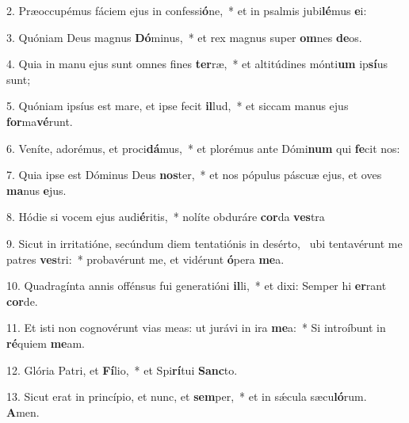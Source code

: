 2. Præoccupémus fáciem ejus in confessi\textbf{ó}ne,~*  et in psalmis jubi\textbf{lé}mus \textbf{e}i:\

3. Quóniam Deus magnus \textbf{Dó}minus,~*  et rex magnus super \textbf{om}nes \textbf{de}os.\

4. Quia in manu ejus sunt omnes fines \textbf{ter}ræ,~*  et altitúdines mónti\textbf{um} ip\textbf{sí}us sunt;\

5. Quóniam ipsíus est mare, et ipse fecit \textbf{il}lud,~*  et siccam manus ejus \textbf{for}ma\textbf{vé}runt.\

6. Veníte, adorémus, et proci\textbf{dá}mus,~*  et plorémus ante Dómi\textbf{num} qui \textbf{fe}cit nos:\

7. Quia ipse est Dóminus Deus \textbf{nos}ter,~*  et nos pópulus páscuæ ejus, et oves \textbf{ma}nus \textbf{e}jus.\

8. Hódie si vocem ejus audi\textbf{é}ritis,~*  nolíte obduráre \textbf{cor}da \textbf{ves}tra\

9. Sicut in irritatióne, secúndum diem tentatiónis in desérto, \dag\  ubi tentavérunt me patres \textbf{ves}tri:~*  probavérunt me, et vidérunt \textbf{ó}pera \textbf{me}a.\

10. Quadragínta annis offénsus fui generatióni \textbf{il}li,~*  et dixi: Semper hi \textbf{er}rant \textbf{cor}de.\

11. Et isti non cognovérunt vias meas: ut jurávi in ira \textbf{me}a:~*  Si introíbunt in \textbf{ré}quiem \textbf{me}am.\

12. Glória Patri, et \textbf{Fí}lio,~*  et Spi\textbf{rí}tui \textbf{Sanc}to.\

13. Sicut erat in princípio, et nunc, et \textbf{sem}per,~*  et in sǽcula sæcu\textbf{ló}rum. \textbf{A}men.\

